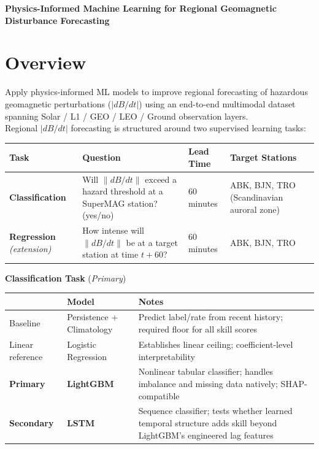 \documentclass{article}
\begin{document}
\pagestyle{fancy}


\begin{center}
\Large\textbf{Physics-Informed Machine Learning for Regional Geomagnetic Disturbance Forecasting}\\
\end{center}

\section*{Overview}
Apply physics-informed ML models to improve regional forecasting of hazardous geomagnetic perturbations ($|dB/dt|$) using an end-to-end multimodal dataset spanning Solar / L1 / GEO / LEO / Ground observation layers.\\ 

\noindent Regional $|dB/dt|$ forecasting is structured around two supervised learning tasks:

\begin{table}[h]
\centering
\begin{tabular}{|l|p{5cm}|l|p{4cm}|}
\hline
\textbf{Task} & \textbf{Question} & \textbf{Lead Time} & \textbf{Target Stations} \\ \hline
\textbf{Classification} & Will $\|dB/dt\|$ exceed a hazard threshold at a SuperMAG station? (yes/no) & 60 minutes & ABK, BJN, TRO (Scandinavian auroral zone) \\ \hline
\textbf{Regression} \textit{(extension)} & How intense will $\|dB/dt\|$ be at a target station at time $t + 60$? & 60 minutes & ABK, BJN, TRO \\ \hline
\end{tabular}
\end{table}

\noindent \textbf{Classification Task} (\textit{Primary})

\begin{table}[h]
\centering
\begin{tabular}{|l|l|p{8cm}|}
\hline
& \textbf{Model} & \textbf{Notes} \\ \hline
Baseline & Persistence + Climatology & Predict label/rate from recent history; required floor for all skill scores \\ \hline
Linear reference & Logistic Regression & Establishes linear ceiling; coefficient-level interpretability \\ \hline
\textbf{Primary} & \textbf{LightGBM} & Nonlinear tabular classifier; handles imbalance and missing data natively; SHAP-compatible \\ \hline
\textbf{Secondary} & \textbf{LSTM} & Sequence classifier; tests whether learned temporal structure adds skill beyond LightGBM's engineered lag features \\ \hline
\end{tabular}
\end{table}
\end{document}
